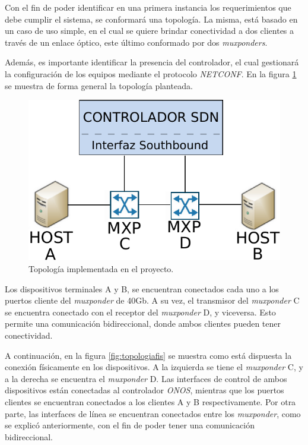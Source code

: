 Con el fin de poder identificar en una primera instancia los requerimientos que debe cumplir el sistema, se conformará una topología. La misma, está basado en un caso de uso simple, en el cual se quiere brindar conectividad a dos clientes a través de un enlace óptico, este último conformado por dos \textit{muxponders}.  

Además, es importante identificar la presencia del controlador, el cual gestionará la configuración de los equipos mediante el protocolo \textit{NETCONF}. En la figura \ref{fig:topologia} se muestra de forma general la topología planteada.

\begin{figure}[H]
    \centering
    \includegraphics[scale=0.85]{Figures/topologia.pdf}
    \caption{Topología implementada en el proyecto.}
    \label{fig:topologia}
  \end{figure}


Los dispositivos terminales A y B, se encuentran conectados cada uno a los puertos cliente del \textit{muxponder} de 40Gb. A su vez, el transmisor del \textit{muxponder} C se encuentra conectado con el receptor del \textit{muxponder} D, y viceversa. Esto permite una comunicación bidireccional, donde ambos clientes pueden tener conectividad. 

A continuación, en la figura \ref{fig:topologiafis} se muestra como está dispuesta la conexión físicamente en los dispositivos. A la izquierda se tiene el \textit{muxponder} C, y a la derecha se encuentra el \textit{muxponder} D. Las interfaces de control de ambos dispositivos están conectadas al controlador \textit{ONOS}, mientras que los puertos clientes se encuentran conectados a los clientes A y B respectivamente. Por otra parte, las interfaces de línea se encuentran conectados entre los \textit{muxponder}, como se explicó anteriormente, con el fin de poder tener una comunicación bidireccional.

